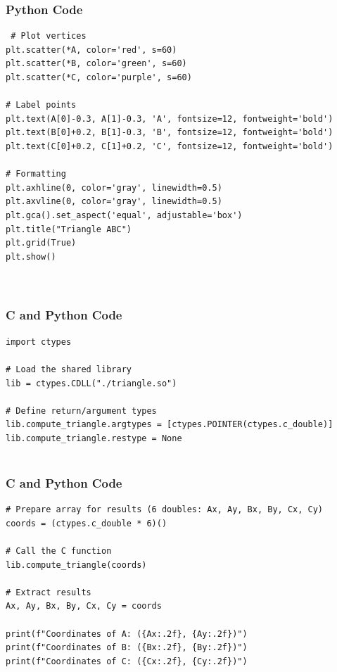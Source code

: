 \documentclass{beamer}
\begin{document}
\begin{frame}[fragile]
    \frametitle{Python Code}
    \begin{lstlisting}
 # Plot vertices
plt.scatter(*A, color='red', s=60)
plt.scatter(*B, color='green', s=60)
plt.scatter(*C, color='purple', s=60)

# Label points
plt.text(A[0]-0.3, A[1]-0.3, 'A', fontsize=12, fontweight='bold')
plt.text(B[0]+0.2, B[1]-0.3, 'B', fontsize=12, fontweight='bold')
plt.text(C[0]+0.2, C[1]+0.2, 'C', fontsize=12, fontweight='bold')

# Formatting
plt.axhline(0, color='gray', linewidth=0.5)
plt.axvline(0, color='gray', linewidth=0.5)
plt.gca().set_aspect('equal', adjustable='box')
plt.title("Triangle ABC")
plt.grid(True)
plt.show()



    \end{lstlisting}
\end{frame}
\begin{frame}[fragile]
    \frametitle{C and Python Code}
    \begin{lstlisting}
import ctypes

# Load the shared library
lib = ctypes.CDLL("./triangle.so")

# Define return/argument types
lib.compute_triangle.argtypes = [ctypes.POINTER(ctypes.c_double)]
lib.compute_triangle.restype = None


    \end{lstlisting}
\end{frame}
 \begin{frame}[fragile]
    \frametitle{C and Python Code}
    \begin{lstlisting}
# Prepare array for results (6 doubles: Ax, Ay, Bx, By, Cx, Cy)
coords = (ctypes.c_double * 6)()

# Call the C function
lib.compute_triangle(coords)

# Extract results
Ax, Ay, Bx, By, Cx, Cy = coords

print(f"Coordinates of A: ({Ax:.2f}, {Ay:.2f})")
print(f"Coordinates of B: ({Bx:.2f}, {By:.2f})")
print(f"Coordinates of C: ({Cx:.2f}, {Cy:.2f})")

\end{lstlisting}
\end{frame}
  
\end{document}
